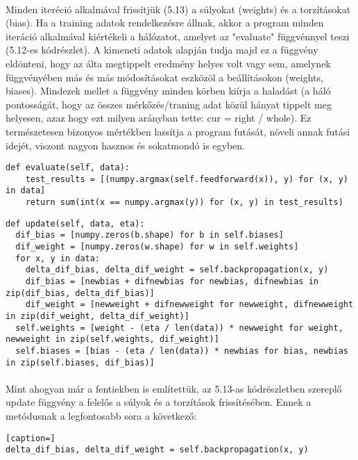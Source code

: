 \paragraph{}
Minden iteréció alkalmával frissítjük (5.13) a súlyokat (weights) és a torzításokat (bias). Ha a training adatok rendelkezésre állnak, akkor a program minden iteráció alkalmával kiértékeli a hálózatot, amelyet az "evaluate" függvénnyel teszi (5.12-es kódrészlet). A kimeneti adatok alapján tudja majd ez a függvény eldönteni, hogy az álta megtippelt eredmény helyes volt vagy sem, amelynek függvényében más és más módosításokat eszközöl a beállításokon (weights, biases). Mindezek mellet a függvény minden körben kiírja a haladást (a háló pontosságát, hogy az összes mérkőzés/traning adat közül hányat tippelt meg helyesen, azaz hogy ezt milyen arányban tette: cur = right / whole). Ez természetesen bizonyos mértékben lassítja a program futását, növeli annak futási idejét, viszont nagyon hasznos és sokatmondó is egyben.

\begin{lstlisting}[caption= A neurális hálót kiértékelő függvény]
def evaluate(self, data):
    test_results = [(numpy.argmax(self.feedforward(x)), y) for (x, y) in data]
    return sum(int(x == numpy.argmax(y)) for (x, y) in test_results)
\end{lstlisting}

\begin{lstlisting}[caption= A neurális hálót kiértékelő függvény]
def update(self, data, eta):
  dif_bias = [numpy.zeros(b.shape) for b in self.biases]
  dif_weight = [numpy.zeros(w.shape) for w in self.weights]
  for x, y in data:
    delta_dif_bias, delta_dif_weight = self.backpropagation(x, y)
    dif_bias = [newbias + difnewbias for newbias, difnewbias in zip(dif_bias, delta_dif_bias)]
    dif_weight = [newweight + difnewweight for newweight, difnewweight in zip(dif_weight, delta_dif_weight)]
  self.weights = [weight - (eta / len(data)) * newweight for weight, newweight in zip(self.weights, dif_weight)]
  self.biases = [bias - (eta / len(data)) * newbias for bias, newbias in zip(self.biases, dif_bias)]
\end{lstlisting}

\paragraph{}
Mint ahogyan már a fentiekben is említettük, az 5.13-as kódrészletben szereplő update függvény a felelős a súlyok és a torzítások frissítésében. Ennek a metódusnak a legfontosabb sora a következő: \\
\begin{lstlisting}[caption=]
delta_dif_bias, delta_dif_weight = self.backpropagation(x, y)
\end{lstlisting}
